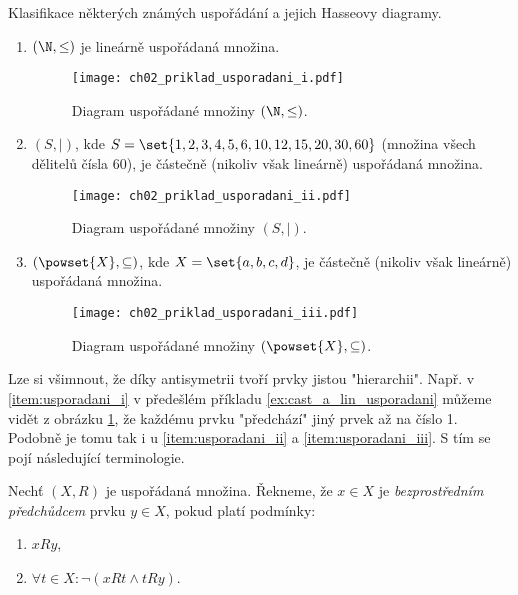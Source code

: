 \begin{example}\label{ex:cast_a_lin_usporadani}
    Klasifikace některých známých uspořádání a jejich Hasseovy diagramy.
    \begin{enumerate}[label=(\roman*)]
        \item\label{item:usporadani_i} $(\N,\leq)$ je lineárně uspořádaná množina.
        \begin{figure}[h]
            \centering
            \texttt{[image: ch02\_priklad\_usporadani\_i.pdf]}
            \caption{Diagram uspořádané množiny $(\N,\leq)$.}
            \label{fig:priklad_usporadani_i}
        \end{figure}
        \item\label{item:usporadani_ii} $(S,\mid)$, kde $S=\set{1, 2, 3, 4, 5, 6, 10, 12, 15, 20, 30, 60}$ (množina všech dělitelů čísla 60), je částečně (nikoliv však lineárně) uspořádaná množina.
        \begin{figure}[h]
            \centering
            \texttt{[image: ch02\_priklad\_usporadani\_ii.pdf]}
            \caption{Diagram uspořádané množiny $(S,\mid)$.}
            \label{fig:priklad_usporadani_ii}
        \end{figure}
        \item\label{item:usporadani_iii} $(\powset{X}, \subseteq)$, kde $X=\set{a,b,c,d}$, je částečně (nikoliv však lineárně) uspořádaná množina.
        \begin{figure}[h]
            \centering
            \texttt{[image: ch02\_priklad\_usporadani\_iii.pdf]}
            \caption{Diagram uspořádané množiny $(\powset{X}, \subseteq)$.}
            \label{fig:priklad_usporadani_iii}
        \end{figure}
    \end{enumerate}
\end{example}
Lze si všimnout, že díky antisymetrii tvoří prvky jistou "hierarchii". Např. v \ref{item:usporadani_i} v předešlém příkladu \ref{ex:cast_a_lin_usporadani} můžeme vidět z obrázku \ref{fig:priklad_usporadani_i}, že každému prvku "předchází" jiný prvek až na číslo 1. Podobně je tomu tak i u \ref{item:usporadani_ii} a \ref{item:usporadani_iii}. S tím se pojí následující terminologie.
\begin{definition}\label{def:predchudce}
    Nechť $(X,R)$ je uspořádaná množina. Řekneme, že $x\in X$ je \emph{bezprostředním předchůdcem} prvku $y\in X$, pokud platí podmínky:
    \begin{enumerate}[label=(\roman*)]
        \item $xRy$,
        \item $\forall t\in X: \neg(xRt \land tRy)$.
    \end{enumerate}
\end{definition}
